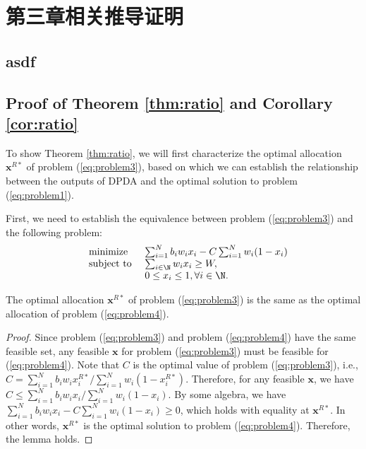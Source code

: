 \chapter{第三章相关推导证明}\label{sec:appB}
\section{asdf}

\section{Proof of Theorem \ref{thm:ratio} and Corollary \ref{cor:ratio}}\label{pf:thm:ratio}
To show Theorem \ref{thm:ratio}, we will first characterize the optimal allocation $\mathbf{x}^{R*}$ of problem (\ref{eq:problem3}), based on which we can establish the relationship between the outputs of DPDA and the optimal solution to problem (\ref{eq:problem1}). 
	
	First, we need to establish the equivalence between problem (\ref{eq:problem3}) and the following problem: 
	\begin{equation}%
	\hspace{-0.0cm}
	\begin{array}
	[c]{lll}%
	&{\text{minimize}}&~\sum_{i=1}^{N}b_iw_ix_i-C\sum_{i=1}^{N}w_i(1-x_i)
	\\
	&\text{subject to}&~ \sum_{i\in\N}w_ix_i\ge W,\\
	&&~ 0\le x_i\le 1, \forall i\in\N.
	\end{array}
	\label{eq:problem4}
	\end{equation}
	
	\begin{lm}\label{lm:equivalence}
		The optimal allocation $\mathbf{x}^{R*}$ of problem (\ref{eq:problem3}) is the same as the optimal allocation of problem (\ref{eq:problem4}).
	\end{lm}
	\begin{proof}
		Since problem (\ref{eq:problem3}) and problem (\ref{eq:problem4}) have the same feasible set, any feasible $\mathbf{x}$ for problem (\ref{eq:problem3}) must be feasible for (\ref{eq:problem4}). Note that $C$ is the optimal value of problem (\ref{eq:problem3}), i.e., $C=\sum_{i=1}^{N}b_iw_ix_i^{R*}/\sum_{i=1}^{N}w_i(1-x_i^{R*})$. Therefore, for any feasible $\mathbf{x}$, we have $C\le\sum_{i=1}^{N}b_iw_ix_i/\sum_{i=1}^{N}w_i(1-x_i)$. By some algebra, we have $\sum_{i=1}^{N}b_iw_ix_i-C\sum_{i=1}^{N}w_i(1-x_i)\ge 0$, which holds with equality at $\mathbf{x}^{R*}$. In other words, $\mathbf{x}^{R*}$ is the optimal solution to problem (\ref{eq:problem4}). Therefore, the lemma holds.
	\end{proof}
	
